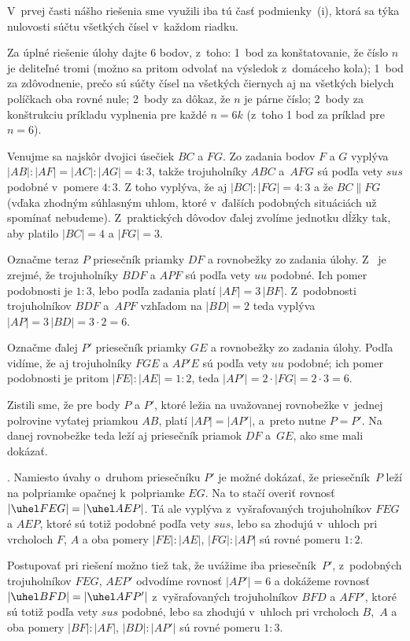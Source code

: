 {\Pozn
V~prvej časti nášho riešenia sme využili
iba tú časť podmienky~(i), ktorá sa týka nulovosti súčtu
všetkých čísel v~každom riadku.

\schemaABC
Za úplné riešenie úlohy dajte 6 bodov, z~toho:
1~bod za konštatovanie, že číslo $n$ je deliteľné tromi (možno sa
pritom odvolať na výsledok z~domáceho kola);
1~bod za zdôvodnenie, prečo sú súčty čísel
na všetkých čiernych aj na všetkých bielych políčkach oba rovné nule;
2~body za dôkaz, že $n$ je párne číslo;
2~body za konštrukciu príkladu vyplnenia pre každé $n=6k$
(z~toho 1 bod za príklad pre $n=6$).
\endschema

}

{%
Venujme sa najskôr dvojici úsečiek $BC$ a $FG$. Zo zadania bodov $F$ a $G$
vyplýva $|AB|:|AF|=|AC|:|AG|=4:3$, takže trojuholníky $ABC$ a~$AFG$
sú podľa vety $sus$ podobné v~pomere $4:3$. Z toho vyplýva, že
aj $|BC|:|FG|=4:3$ a že $BC\parallel FG$ (vďaka zhodným súhlasným uhlom,
ktoré v~ďalších podobných situáciách už spomínať nebudeme).
Z~praktických dôvodov ďalej zvolíme jednotku dĺžky tak,
aby platilo $|BC|=4$ a $|FG|=3$.

Označme teraz $P$ priesečník priamky $DF$ a rovnobežky zo zadania
úlohy. Z~\obr{} je zrejmé, že trojuholníky $BDF$ a $APF$
sú podľa vety $uu$ podobné. Ich pomer podobnosti je $1:3$, lebo
podľa zadania platí $|AF|=3\,|BF|$. Z~podobnosti trojuholníkov
$BDF$ a~$APF$ vzhľadom na $|BD|=2$ teda vyplýva
$|AP|=3\,|BD|=3\cdot 2=6$.

Označme ďalej $P'$ priesečník priamky $GE$ a rovnobežky zo zadania
úlohy. Podľa~\obr{} vidíme, že aj trojuholníky $FGE$ a $AP'E$
sú podľa vety $uu$ podobné; ich pomer podobnosti je
pritom $|FE|:|AE|=1:2$, teda $|AP'|=2\cdot |FG|=2\cdot 3=6$.
%

Zistili sme, že pre body $P$ a $P'$, ktoré ležia
na uvažovanej rovnobežke v~jednej polrovine vyťatej priamkou $AB$,
platí $|AP|=|AP'|$, a~preto nutne $P=P'$.
Na danej rovnobežke teda leží aj priesečník priamok $DF$ a~$GE$,
ako sme mali dokázať.

.
Namiesto úvahy o~druhom priesečníku $P'$ je možné dokázať, že
priesečník~$P$ leží na polpriamke opačnej k~polpriamke $EG$. Na to
stačí overiť rovnosť $|\uhel FEG|=|\uhel AEP|$. Tá ale vyplýva
z~vyšrafovaných trojuholníkov $FEG$ a $AEP$, ktoré sú totiž podobné podľa vety $sus$,
lebo sa zhodujú v~uhloch pri vrcholoch $F$, $A$ a oba pomery
$|FE|:|AE|$, $|FG|:|AP|$ sú rovné pomeru $1:2$.

Postupovať pri riešení možno tiež tak, že uvážime iba priesečník~$P'$,
z~podobných trojuholníkov $FEG$, $AEP'$ odvodíme rovnosť $|AP'|=6$ a
dokážeme rovnosť $|\uhel BFD|=|\uhel AFP'|$ z~vyšrafovaných trojuholníkov $BFD$ a $AFP'$,
ktoré sú totiž podľa vety $sus$ podobné,
lebo sa zhodujú v~uhloch pri vrcholoch $B$,~$A$ a
oba pomery $|BF|:|AF|$, $|BD|:|AP'|$ sú rovné pomeru
$1:3$.

}
